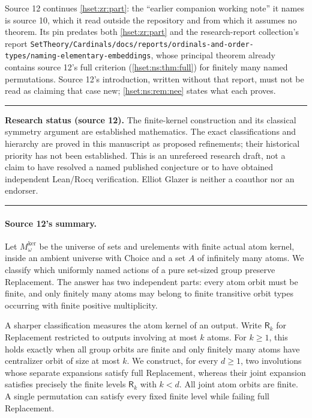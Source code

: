 \documentclass[11pt,letterpaper]{article}
\theoremstyle{definition}
\theoremstyle{remark}
\newcommand{\repo}[1]{\nolinkurl{#1}}
\newcommand{\Mker}{M^{\mathrm{ker}}}
\newenvironment{resultbox}{\par\medskip\noindent\begin{minipage}{\linewidth}\setlength{\parindent}{0pt}\hrule\medskip}{\medskip\hrule\end{minipage}\par\medskip}
\begin{document}
Source 12 continues \cref{hset:zr:part}: the ``earlier companion working note''
it names is source 10, which it read outside the repository and from which it
assumes no theorem. Its pin predates both \cref{hset:zr:part} and the
research-report collection's report
\repo{SetTheory/Cardinals/docs/reports/ordinals-and-order-types/naming-elementary-embeddings},
whose principal theorem already contains source 12's full criterion
(\cref{hset:ns:thm:full}) for finitely many named permutations. Source 12's
introduction, written without that report, must not be read as claiming that
case new; \cref{hset:ns:rem:nee} states what each proves.

\begin{resultbox}
\textbf{Research status (source 12).} The finite-kernel construction and its classical symmetry argument are established mathematics. The exact classifications and hierarchy are proved in this manuscript as proposed refinements; their historical priority has not been established. This is an unrefereed research draft, not a claim to have resolved a named published conjecture or to have obtained independent Lean/Rocq verification. Elliot Glazer is neither a coauthor nor an endorser.
\end{resultbox}

\paragraph{Source 12's summary.} Let $\Mker_\omega$ be the universe of sets and urelements with finite actual atom kernel, inside an ambient universe with Choice and a set $A$ of infinitely many atoms. We classify which uniformly named actions of a pure set-sized group preserve Replacement. The answer has two independent parts: every atom orbit must be finite, and only finitely many atoms may belong to finite transitive orbit types occurring with finite positive multiplicity.

A sharper classification measures the atom kernel of an output. Write $\mathsf R_k$ for Replacement restricted to outputs involving at most $k$ atoms. For $k\ge1$, this holds exactly when all group orbits are finite and only finitely many atoms have centralizer orbit of size at most $k$. We construct, for every $d\ge1$, two involutions whose separate expansions satisfy full Replacement, whereas their joint expansion satisfies precisely the finite levels $\mathsf R_k$ with $k<d$. All joint atom orbits are finite. A single permutation can satisfy every fixed finite level while failing full Replacement.
\end{document}
